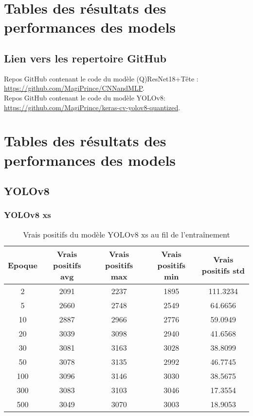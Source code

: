 \appendix

\chapter{Tables des résultats des performances des models}
\label{annexe_links_to_work}

\section{Lien vers les repertoire GitHub}

Repos GitHub contenant le code du modèle (Q)ResNet18+Tête : \url{https://github.com/MagiPrince/CNNandMLP}.\\
Repos GitHub contenant le code du modèle YOLOv8: \url{https://github.com/MagiPrince/keras-cv-yolov8-quantized}.

\chapter{Tables des résultats des performances des models}
\label{annexe_model_results_tables}

\section{YOLOv8}


\subsection{YOLOv8 xs}

\begin{table}[!ht]
    \caption{Vrais positifs du modèle YOLOv8 xs au fil de l'entraînement}
    \label{tab:yolov8xs_true_positive}
    \centering
    \begin{tabular}{ |c||c|c|c|c|  }
        \hline
        \rowcolor{gray!50}
        Epoque & Vrais positifs avg & Vrais positifs max & Vrais positifs min & Vrais positifs std\\
        \hline
        2 & 2091 & 2237 & 1895 & 111.3234\\
        5 & 2660 & 2748 & 2549 & 64.6656\\
        10 & 2887 & 2966 & 2776 & 59.0949\\
        20 & 3039 & 3098 & 2940 & 41.6568\\
        30 & 3081 & 3163 & 3028 & 38.8099\\
        50 & 3078 & 3135 & 2992 & 46.7745\\
        100 & 3096 & 3146 & 3030 & 38.5675\\
        300 & 3083 & 3103 & 3046 & 17.3554\\
        500 & 3049 & 3070 & 3003 & 18.9053\\
        \hline
    \end{tabular}
\end{table}

